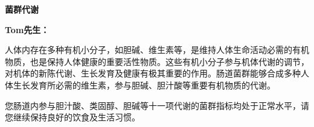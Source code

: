 

\usepackage{graphicx}
\graphicspath{{cores/}}



\setlength{\arrayrulewidth}{0.5pt}
\fontsize{9.3pt}{17pt}\selectfont
\color{gray2}

\vspace*{0mm}
\begin{center}
{\bf\sanhao 菌群代谢}
\end{center}

\medskip
\noindent
{\bf\xiaosihao Tom先生：}

\bigskip

人体内存在多种有机小分子，如胆碱、维生素等，是维持人体生命活动必需的有机物质，也是保持人体健康的重要活性物质。这些有机小分子参与机体代谢的调节，对机体的新陈代谢、生长发育及健康有极其重要的作用。肠道菌群能够合成多种人体生长发育所必需的维生素，参与胆碱、胆汁酸等重要有机物质的代谢。

您肠道内参与胆汁酸、类固醇、胆碱等十一项代谢的菌群指标均处于正常水平，请您继续保持良好的饮食及生活习惯。

